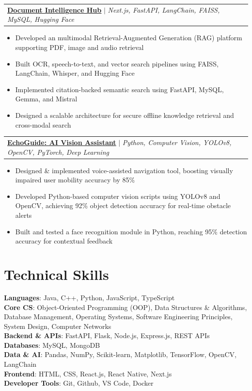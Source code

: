 \documentclass[letterpaper,11pt]{article}
\makeatletter
\newcommand{\resumeItem}[1]{
  \item\small{
    {#1 \vspace{-2pt}}
  }
}
\newcommand{\resumeProjectHeading}[2]{
    \item
    \begin{tabular*}{0.97\textwidth}{l@{\extracolsep{\fill}}r}
      \small#1 & #2 \\
    \end{tabular*}\vspace{-7pt}
}
\newcommand{\resumeItemListStart}{\begin{itemize}}
\newcommand{\resumeItemListEnd}{\end{itemize}\vspace{-8pt}}
\makeatother
\begin{document}
\resumeProjectHeading
{\textbf{\href{https://github.com/SaadZiaatharKhan/KMRL}{\underline{Document Intelligence Hub}}} $|$ \emph{Next.js, FastAPI, LangChain, FAISS, MySQL, Hugging Face}}{}
\resumeItemListStart
\resumeItem{Developed an multimodal Retrieval-Augmented Generation (RAG) platform supporting PDF, image and audio retrieval}
\resumeItem{Built OCR, speech-to-text, and vector search pipelines using FAISS, LangChain, Whisper, and Hugging Face}
\resumeItem{ Implemented citation-backed semantic search using FastAPI, MySQL, Gemma, and Mistral}
\resumeItem{Designed a scalable architecture for secure offline knowledge retrieval and cross-modal search}
\resumeItemListEnd

\resumeProjectHeading
{\textbf{\href{https://github.com/SaadZiaatharKhan/EchoGuide}{\underline{EchoGuide: AI Vision Assistant}}} $|$ \emph{Python, Computer Vision, YOLOv8, OpenCV, PyTorch, Deep Learning}}{}
\resumeItemListStart
\resumeItem{Designed \& implemented voice-assisted navigation tool, boosting visually impaired user mobility accuracy by 85\%}
\resumeItem{Developed Python-based computer vision scripts using YOLOv8 and OpenCV, achieving 92\% object detection
accuracy for real-time obstacle alerts}
\resumeItem{Built and tested a face recognition module in Python, reaching 95\% detection accuracy for contextual feedback}
\resumeItemListEnd

\section{Technical Skills}
\begin{itemize}[leftmargin=0.15in, label={}]
\small{\item{
\textbf{Languages}{: Java, C++, Python, JavaScript, TypeScript} \\
\textbf{Core CS}{:  Object-Oriented Programming (OOP), Data Structures \& Algorithms, Database Management, Operating Systems, Software Engineering Principles, System Design, Computer Networks
} \\
\textbf{Backend \& APIs}{:  FastAPI, Flask, Node.js, Express.js, REST APIs} \\
\textbf{Databases}{: MySQL, MongoDB} \\
\textbf{Data \& AI}{: Pandas, NumPy, Scikit-learn, Matplotlib, TensorFlow, OpenCV, LangChain}\\
\textbf{Frontend}{: HTML, CSS, React.js, React Native, Next.js} \\
\textbf{Developer Tools}{: Git, Github, VS Code, Docker}
}}
\end{itemize}
\end{document}
